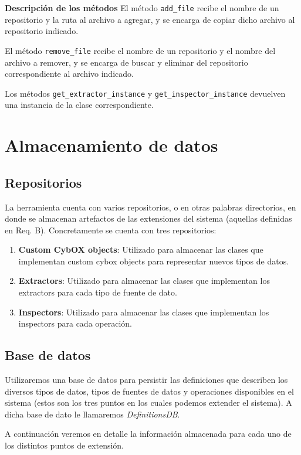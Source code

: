 \textbf{Descripción de los métodos} \newline
El método \texttt{add\_file} recibe el nombre de un repositorio y la ruta al archivo a agregar, y se encarga de copiar dicho archivo al repositorio indicado.

El método \texttt{remove\_file} recibe el nombre de un repositorio y el nombre del archivo a remover, y se encarga de buscar y eliminar del repositorio correspondiente al archivo indicado.

Los métodos \texttt{get\_extractor\_instance} y \texttt{get\_inspector\_instance} devuelven una instancia de la clase correspondiente.

\section{Almacenamiento de datos}
\subsection{Repositorios} \label{repositorios}
La herramienta cuenta con varios repositorios, o en otras palabras directorios, en donde se almacenan artefactos de las extensiones del sistema (aquellas definidas en Req. B). Concretamente se cuenta con tres repositorios:

\begin{enumerate}
\item \textbf{Custom CybOX objects}: Utilizado para almacenar las clases que implementan custom cybox objects para representar nuevos tipos de datos.
\item \textbf{Extractors}: Utilizado para almacenar las clases que implementan los extractors para cada tipo de fuente de dato.
\item \textbf{Inspectors}: Utilizado para almacenar las clases que implementan los inspectors para cada operación.
\end{enumerate}

\subsection{Base de datos}
Utilizaremos una base de datos para persistir las definiciones que describen los diversos tipos de datos, tipos de fuentes de datos y operaciones disponibles en el sistema (estos son los tres puntos en los cuales podemos extender el sistema). A dicha base de dato le llamaremos \emph{DefinitionsDB}.

A continuación veremos en detalle la información almacenada para cada uno de los distintos puntos de extensión.
\newline

